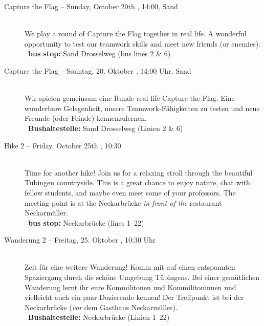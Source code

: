 \begin{description}
\ifml
    \item[Capture the Flag -- Sunday, October 20th \YEAR, 14:00, Sand]~\\
    We play a round of Capture the Flag together in real life.
    A wonderful opportunity to test our teamwork skills and meet new friends (or enemies).\\
    ~\textbf{bus stop:} Sand Drosselweg (bus lines 2 \& 6)
\else
    \item[Capture the Flag -- Sonntag, 20. Oktober \YEAR, 14:00 Uhr, Sand]~\\
    Wir spielen gemeinsam eine Runde real-life Capture the Flag.
    Eine wunderbare Gelegenheit, unsere Teamwork-Fähigkeiten zu testen und neue Freunde (oder Feinde) kennenzulernen.\\
    ~\textbf{Bushaltestelle:} Sand Drosselweg (Linien 2 \& 6)
\fi

\ifml
    \item[Hike 2 -- Friday, October 25th \YEAR, 10:30]~\\%
    Time for another hike! Join us for a relaxing stroll through the beautiful Tübingen countryside.
    This is a great chance to enjoy nature, chat with fellow students, and maybe even meet some of your professors.
    The meeting point is at the Neckarbrücke \emph{in front of the} restaurant \glqq Neckarmüller\grqq. \\
    ~\textbf{bus stop:} Neckarbrücke (lines 1--22)
\else
    \item[Wanderung 2 -- Freitag, 25. Oktober \YEAR, 10:30 Uhr]~\\%
    Zeit für eine weitere Wanderung! Komm mit auf einen entspannten Spaziergang durch die schöne Umgebung Tübingens.
    Bei einer gemütlichen Wanderung lernt ihr eure Kommilitonen und Kommilitoninnen
    und vielleicht auch ein paar Dozierende kennen!
    Der Treffpunkt ist bei der Neckarbrücke (\emph{vor} dem Gasthaus \glqq Neckarmüller\grqq).\\
    ~\textbf{Bushaltestelle:} Neckarbrücke (Linien 1--22)
\fi


\end{description}
